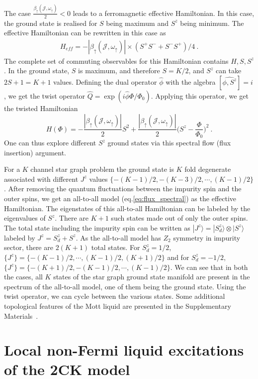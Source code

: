 \documentclass[reprint,prb,superscriptaddress]{revtex4-2}
\begin{document}
The case $\frac{\beta_{\uparrow}({\mathcal{J}},\omega_{\uparrow})}{2} <0$ leads to a ferromagnetic effective Hamiltonian. In this case, the ground state is realised for $S$ being maximum and $S^z$ being minimum. The effective Hamiltonian can be rewritten in this case as
\begin{eqnarray}
H_{eff}   =-|\beta_{\uparrow}({\mathcal{J}},\omega_{\uparrow})| \times(S^+S^{-}+ S^-S^{+}) /4   ~.
\end{eqnarray}
The complete set of commuting observables for this Hamiltonian contains $H,S,S^z$. In the ground state, $S$ is maximum, and  therefore $S=K/2$, and $S^z$ can take $2S+1=K+1$ values. Defining the dual operator \(\hat \phi\) with the algebra \([\hat{\phi,S^z}]=i\), we get the twist operator $\hat{Q}=\exp(i\hat{\phi}\Phi/\Phi_0)$. Applying this operator, we get the twisted Hamiltonian 
\begin{equation}
H(\Phi) = -\frac{|\beta_{\uparrow}({\mathcal{J}},\omega_{\uparrow})|}{2} S^2   +\frac{|\beta_{\uparrow}({\mathcal{J}},\omega_{\uparrow})|}{2} \bigg(S^{z}-\frac{\Phi}{\Phi_0} \bigg)^2 ~.
\label{eq:flux_spectral}
\end{equation}
One can thus explore different $S^z$ ground states via this spectral flow (flux insertion) argument.

For a $K$ channel star graph problem the ground state is $K$ fold degenerate associated with different $J^z$ values $\{-(K-1)/2,-(K-3)/2,\cdots  ,(K-1)/2 \}$. After removing the quantum fluctuations between the impurity spin and the outer spins, we get an all-to-all model (eq.\eqref{eq:flux_spectral}) as the effective Hamiltonian. The eigenstates of this all-to-all Hamiltonian can be labeled by the eigenvalues of $S^z$. There are $K+1$ such states made out of only the outer spins. The total state including the impurity spin can be written as $|J^z\rangle = |S_d^z\rangle \otimes |S^z\rangle$ labeled by $J^z=S_d^z+S^z$. As the all-to-all model has $Z_2$ symmetry in impurity sector, there are $2(K+1)$ total states. For $S_d^z=1/2$, $ \{J^z\}=\{ -(K-1)/2, \cdots, (K-1)/2, (K+1)/2 \}$ and for $S_d^z=-1/2$, $\{J^z\}=\{-(K+1)/2, -(K-1)/2, \cdots,  (K-1)/2  \}$. We can see that in both the cases, all $K$ states of the star graph ground state manifold are present in the spectrum of the all-to-all model, one of them being the ground state. Using the twist operator, we can cycle between the various states. Some additional topological features of the Mott liquid are presented in the Supplementary Materials~\cite{SM}.

\section{Local non-Fermi liquid excitations of the 2CK model}
\label{sec:excitations}
\end{document}
